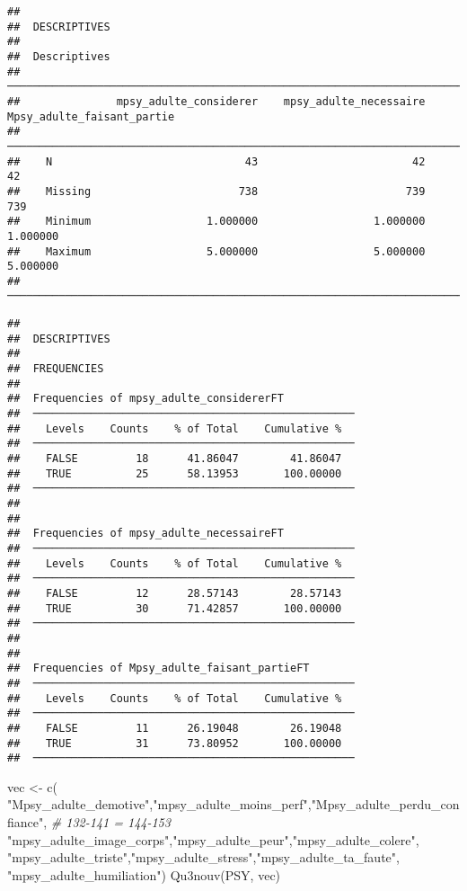 \documentclass[
]{article}
\newenvironment{Shaded}{\begin{snugshade}}{\end{snugshade}}
\newcommand{\CommentTok}[1]{\textcolor[rgb]{0.56,0.35,0.01}{\textit{#1}}}
\newcommand{\FunctionTok}[1]{\textcolor[rgb]{0.00,0.00,0.00}{#1}}
\newcommand{\NormalTok}[1]{#1}
\newcommand{\OtherTok}[1]{\textcolor[rgb]{0.56,0.35,0.01}{#1}}
\newcommand{\StringTok}[1]{\textcolor[rgb]{0.31,0.60,0.02}{#1}}
\begin{document}
\begin{verbatim}
## 
##  DESCRIPTIVES
## 
##  Descriptives                                                                                  
##  ───────────────────────────────────────────────────────────────────────────────────────────── 
##               mpsy_adulte_considerer    mpsy_adulte_necessaire    Mpsy_adulte_faisant_partie   
##  ───────────────────────────────────────────────────────────────────────────────────────────── 
##    N                              43                        42                            42   
##    Missing                       738                       739                           739   
##    Minimum                  1.000000                  1.000000                      1.000000   
##    Maximum                  5.000000                  5.000000                      5.000000   
##  ─────────────────────────────────────────────────────────────────────────────────────────────
\end{verbatim}

\begin{verbatim}
## 
##  DESCRIPTIVES
## 
##  FREQUENCIES
## 
##  Frequencies of mpsy_adulte_considererFT            
##  ────────────────────────────────────────────────── 
##    Levels    Counts    % of Total    Cumulative %   
##  ────────────────────────────────────────────────── 
##    FALSE         18      41.86047        41.86047   
##    TRUE          25      58.13953       100.00000   
##  ────────────────────────────────────────────────── 
## 
## 
##  Frequencies of mpsy_adulte_necessaireFT            
##  ────────────────────────────────────────────────── 
##    Levels    Counts    % of Total    Cumulative %   
##  ────────────────────────────────────────────────── 
##    FALSE         12      28.57143        28.57143   
##    TRUE          30      71.42857       100.00000   
##  ────────────────────────────────────────────────── 
## 
## 
##  Frequencies of Mpsy_adulte_faisant_partieFT        
##  ────────────────────────────────────────────────── 
##    Levels    Counts    % of Total    Cumulative %   
##  ────────────────────────────────────────────────── 
##    FALSE         11      26.19048        26.19048   
##    TRUE          31      73.80952       100.00000   
##  ──────────────────────────────────────────────────
\end{verbatim}

\begin{Shaded}
\begin{Highlighting}[]
\NormalTok{vec }\OtherTok{\textless{}{-}} \FunctionTok{c}\NormalTok{( }\StringTok{"Mpsy\_adulte\_demotive"}\NormalTok{,}\StringTok{"mpsy\_adulte\_moins\_perf"}\NormalTok{,}\StringTok{"Mpsy\_adulte\_perdu\_confiance"}\NormalTok{,  }\CommentTok{\# 132{-}141 = 144{-}153}
     \StringTok{"mpsy\_adulte\_image\_corps"}\NormalTok{,}\StringTok{"mpsy\_adulte\_peur"}\NormalTok{,}\StringTok{"mpsy\_adulte\_colere"}\NormalTok{,}
     \StringTok{"mpsy\_adulte\_triste"}\NormalTok{,}\StringTok{"mpsy\_adulte\_stress"}\NormalTok{,}\StringTok{"mpsy\_adulte\_ta\_faute"}\NormalTok{,}
     \StringTok{"mpsy\_adulte\_humiliation"}\NormalTok{)}
\FunctionTok{Qu3nouv}\NormalTok{(PSY, vec)}
\end{Highlighting}
\end{Shaded}
\end{document}
